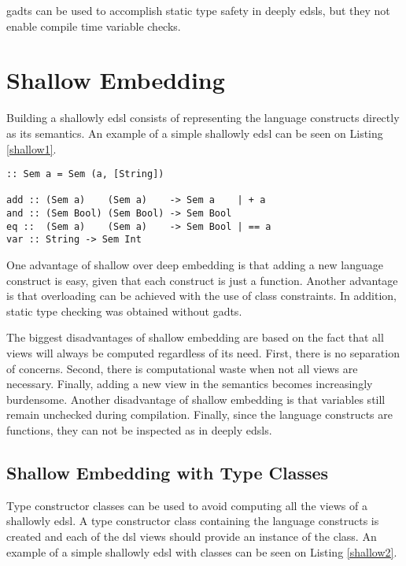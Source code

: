 \acp{gadt} can be used to accomplish static type safety in deeply \acp{edsl}, but they not enable compile time variable checks. 

\section{Shallow Embedding}
Building a shallowly \ac{edsl} consists of representing the language constructs directly as its semantics. An example of a simple shallowly \ac{edsl} can be seen on Listing \ref{shallow1}.

\begin{lstlisting}[caption=A simple shallowly \ac{edsl},captionpos=b,label=shallow1]
:: Sem a = Sem (a, [String])

add :: (Sem a)    (Sem a)    -> Sem a    | + a
and :: (Sem Bool) (Sem Bool) -> Sem Bool
eq ::  (Sem a)    (Sem a)    -> Sem Bool | == a
var :: String -> Sem Int
\end{lstlisting}

One advantage of shallow over deep embedding is that adding a new language construct is easy, given that each construct is just a function. Another advantage is that overloading can be achieved with the use of class constraints. In addition, static type checking was obtained without \acp{gadt}. 

The biggest disadvantages of shallow embedding are based on the fact that all views will always be computed regardless of its need. First, there is no separation of concerns. Second, there is computational waste when not all views are necessary. Finally, adding a new view in the semantics becomes increasingly burdensome. Another disadvantage of shallow embedding is that variables still remain unchecked during compilation. Finally, since the language constructs are functions, they can not be inspected as in deeply \acp{edsl}.

\subsection{Shallow Embedding with Type Classes}\label{sec:class_based_edsl}

Type constructor classes can be used to avoid computing all the views of a shallowly \ac{edsl}. A type constructor class containing the language constructs is created and each of the \ac{dsl} views should provide an instance of the class. An example of a simple shallowly \ac{edsl} with classes can be seen on Listing \ref{shallow2}.

